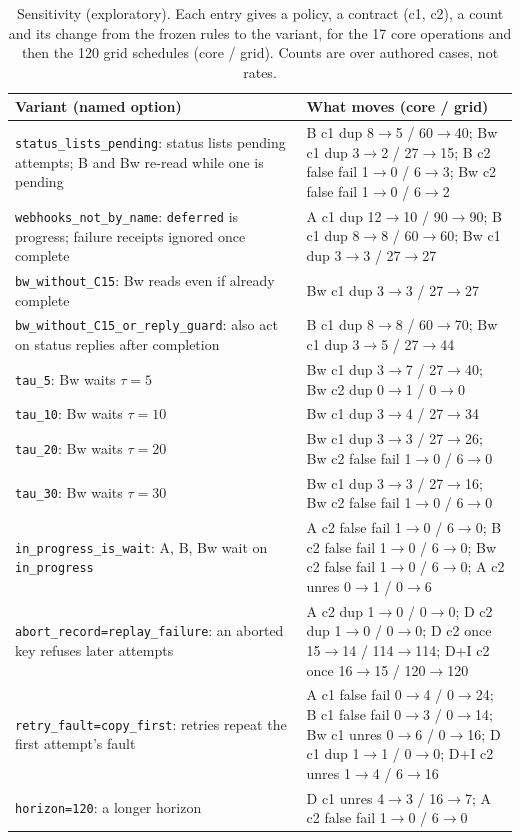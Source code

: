 \documentclass[11pt]{article}
\newcommand{\code}[1]{\texttt{#1}}
\begin{document}
\begin{table}[!htbp]
\centering
\footnotesize
\caption{Sensitivity (exploratory). Each entry gives a policy, a contract (c1, c2), a count and its change from the frozen rules to the variant, for the 17 core operations and then the 120 grid schedules (core / grid). Counts are over authored cases, not rates.}
\label{tab:sensitivity}
\begin{tabular}{@{}L{5.6cm}L{10.0cm}@{}}
\toprule
Variant (named option) & What moves (core / grid) \\
\midrule
\code{status\_lists\_pending}: status lists pending attempts; B and Bw re-read while one is pending & B c1 dup 8$\to$5 / 60$\to$40; Bw c1 dup 3$\to$2 / 27$\to$15; B c2 false fail 1$\to$0 / 6$\to$3; Bw c2 false fail 1$\to$0 / 6$\to$2 \\
\code{webhooks\_not\_by\_name}: \code{deferred} is progress; failure receipts ignored once complete & A c1 dup 12$\to$10 / 90$\to$90; B c1 dup 8$\to$8 / 60$\to$60; Bw c1 dup 3$\to$3 / 27$\to$27 \\
\code{bw\_without\_C15}: Bw reads even if already complete & Bw c1 dup 3$\to$3 / 27$\to$27 \\
\code{bw\_without\_C15\_or\_reply\_guard}: also act on status replies after completion & B c1 dup 8$\to$8 / 60$\to$70; Bw c1 dup 3$\to$5 / 27$\to$44 \\
\code{tau\_5}: Bw waits $\tau=5$ & Bw c1 dup 3$\to$7 / 27$\to$40; Bw c2 dup 0$\to$1 / 0$\to$0 \\
\code{tau\_10}: Bw waits $\tau=10$ & Bw c1 dup 3$\to$4 / 27$\to$34 \\
\code{tau\_20}: Bw waits $\tau=20$ & Bw c1 dup 3$\to$3 / 27$\to$26; Bw c2 false fail 1$\to$0 / 6$\to$0 \\
\code{tau\_30}: Bw waits $\tau=30$ & Bw c1 dup 3$\to$3 / 27$\to$16; Bw c2 false fail 1$\to$0 / 6$\to$0 \\
\code{in\_progress\_is\_wait}: A, B, Bw wait on \code{in\_progress} & A c2 false fail 1$\to$0 / 6$\to$0; B c2 false fail 1$\to$0 / 6$\to$0; Bw c2 false fail 1$\to$0 / 6$\to$0; A c2 unres 0$\to$1 / 0$\to$6 \\
\code{abort\_record=replay\_failure}: an aborted key refuses later attempts & A c2 dup 1$\to$0 / 0$\to$0; D c2 dup 1$\to$0 / 0$\to$0; D c2 once 15$\to$14 / 114$\to$114; D+I c2 once 16$\to$15 / 120$\to$120 \\
\code{retry\_fault=copy\_first}: retries repeat the first attempt's fault & A c1 false fail 0$\to$4 / 0$\to$24; B c1 false fail 0$\to$3 / 0$\to$14; Bw c1 unres 0$\to$6 / 0$\to$16; D c1 dup 1$\to$1 / 0$\to$0; D+I c2 unres 1$\to$4 / 6$\to$16 \\
\code{horizon=120}: a longer horizon & D c1 unres 4$\to$3 / 16$\to$7; A c2 false fail 1$\to$0 / 6$\to$0 \\
\bottomrule
\end{tabular}
\end{table}
\end{document}
